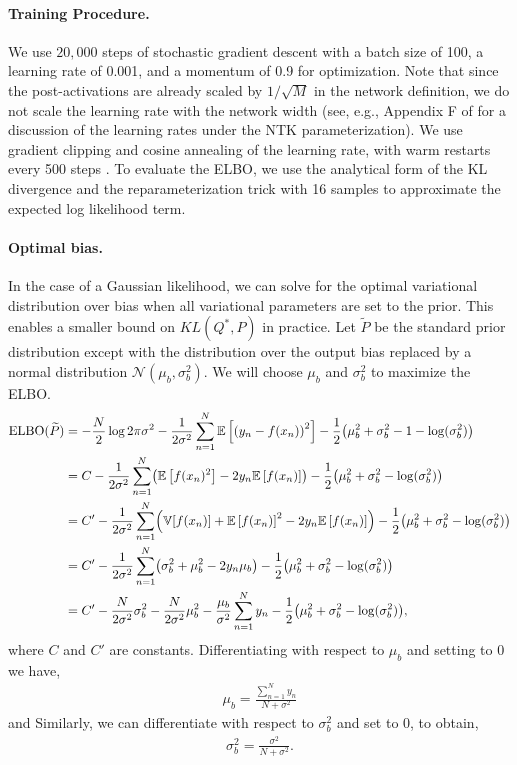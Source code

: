 \documentclass[twoside]{article}
\newcommand{\E}{\mathbb{E}}
\newcommand{\V}{\mathbb{V}}
\newcommand{\Var}{\V}
\DeclarePairedDelimiter\parens{(}{)}             %
\theoremstyle{theoremstyle}
\begin{document}
\paragraph{Training Procedure.} We use $20{,}000$ steps of stochastic gradient descent with a batch size of 100, a learning rate of 0.001, and a momentum of 0.9 for optimization. Note that since the post-activations are already scaled by $1/\sqrt{M}$ in the network definition, we do not scale the learning rate with the network width (see, e.g., Appendix F of \citep{lee_2019} for a discussion of the learning rates under the NTK parameterization). We use gradient clipping and cosine annealing of the learning rate, with warm restarts every 500 steps \citep{loshchilov_2017}. To evaluate the ELBO, we use the analytical form of the KL divergence and the reparameterization trick \citep{kingma_2014} with 16 samples to approximate the expected log likelihood term. 

\paragraph{Optimal bias.} In the case of a Gaussian likelihood, we can solve for the optimal variational distribution over bias when all variational parameters are set to the prior. This enables a smaller bound on $KL(Q^*,P)$ in practice. Let $\widetilde{P}$ be the standard prior distribution except with the distribution over the output bias replaced by a normal distribution $\mathcal{N}(\mu_b, \sigma^2_b)$. We will choose $\mu_b$ and $\sigma^2_b$ to maximize the ELBO. 
\begin{align}
\mathrm{ELBO}(\widetilde{P}) &= -\frac{N}{2}\log 2 \pi \sigma^2 - \frac{1}{2\sigma^2} \sum_{n=1}^N \E\left[\parens*{y_n - f(x_n)}^2\right] - \frac{1}{2}\parens*{\mu_b^2 + \sigma_b^2 -1 - \log(\sigma_b^2)} 
\\
& = C - \frac{1}{2\sigma^2} \sum_{n=1}^N \parens*{\E\left[ f(x_n)^2\right] - 2y_n\E\left[ f(x_n)\right]} -  \frac{1}{2}\parens*{\mu_b^2 + \sigma_b^2 - \log(\sigma_b^2)} 
\\
& = C' - \frac{1}{2\sigma^2} \sum_{n=1}^N \parens*{\Var[f(x_n)] + \E\left[ f(x_n)\right]^2 - 2y_n\E\left[ f(x_n)\right]} -  \frac{1}{2}\parens*{\mu_b^2 + \sigma_b^2 - \log(\sigma_b^2)} 
\\
& = C' - \frac{1}{2\sigma^2} \sum_{n=1}^N \parens*{\sigma_b^2 + \mu_b^2 - 2y_n\mu_b} -  \frac{1}{2}\parens*{\mu_b^2 + \sigma_b^2 - \log(\sigma_b^2)}
\\ 
& = C' - \frac{N}{2\sigma^2}\sigma_b^2 - \frac{N}{2\sigma^2} \mu_b^2 - \frac{\mu_b}{\sigma^2}\sum_{n=1}^Ny_n -  \frac{1}{2}\parens*{\mu_b^2 + \sigma_b^2 - \log(\sigma_b^2)},
\end{align}
where $C$ and $C'$ are constants. 
Differentiating with respect to $\mu_b$ and setting to $0$ we have,
\begin{align}
   \mu_b   = \frac{\sum_{n=1}^Ny_n}{N+ \sigma^2} 
\end{align}
and 
Similarly, we can differentiate with respect to $\sigma^2_b$ and set to 0, to obtain,
\begin{align}
    \sigma_b^2 = \frac{\sigma^2}{N+ \sigma^2}. 
\end{align}
\end{document}

